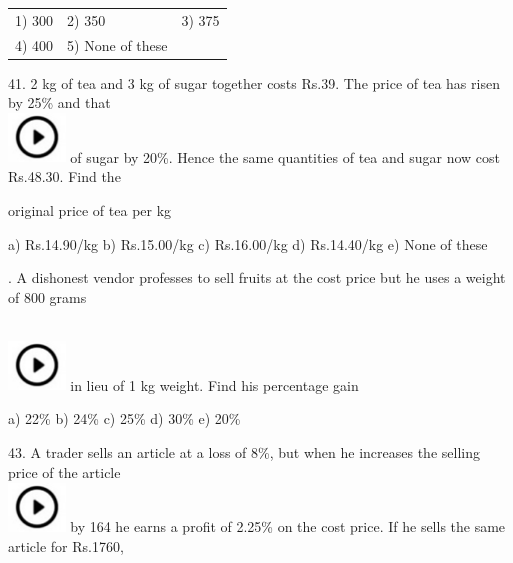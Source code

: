 \documentclass{article} %
\begin{document}
\noindent 
\begin{tabular}{p{1.7in} p{1.6in} p{1.6in}} \\ 
	1) 300                      &  2) 350               &  3) 375               \\
4) 400               & 5) None of these  \\
\end{tabular}

\noindent 

\noindent 

41. 2 kg of tea and 3 kg of sugar together costs Rs.39. The price of tea has risen by 25\% and that  
\noindent \\ \includegraphics*[width=0.60in, height=0.52in]{images/image1} of sugar by 20\%. Hence the same quantities of tea and sugar now cost Rs.48.30. Find the

\noindent original price of tea per kg

\noindent 

\noindent a) Rs.14.90/kg        b) Rs.15.00/kg c) Rs.16.00/kg  d) Rs.14.40/kg e) None of these

\noindent 

. A dishonest vendor professes to sell fruits at the cost price but he uses a weight of 800 grams

\noindent  
\noindent \\ \includegraphics*[width=0.60in, height=0.52in]{images/image1} in lieu of 1 kg weight. Find his percentage gain

\noindent a) 22\%                    b) 24\%              c) 25\%              d) 30\%              e) 20\%

\noindent 

\noindent 

\noindent 

\noindent 

43. A trader sells an article at a loss of 8\%, but when he increases the selling price of the article  
\noindent \\ \includegraphics*[width=0.60in, height=0.52in]{images/image1} by 164 he earns a profit of 2.25\% on the cost price. If he sells the same article for Rs.1760,
\end{document}
